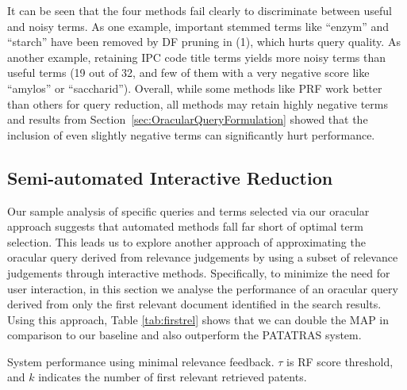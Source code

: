 It can be seen that the four methods fail clearly to discriminate between useful and noisy terms. As one example, important stemmed terms like ``enzym'' and ``starch'' have been removed by DF pruning in (1), which hurts query quality.  As another example, retaining IPC code title terms yields more noisy terms than useful terms (19 out of 32, and few of them with a very negative score like ``amylos'' or ``saccharid''). Overall, while some methods like PRF work better than others for query reduction, all methods may retain highly negative terms and results from Section~\ref{sec:OracularQueryFormulation} showed that the inclusion of even slightly negative terms can significantly hurt performance.
\subsection{Semi-automated Interactive Reduction}
\label{sec:SemiAutomatedInteractiveReduction}

Our sample analysis of specific queries and terms selected via our oracular
approach suggests that automated methods fall far short of optimal term selection.
This leads us to explore another approach of approximating the oracular query
derived from relevance judgements by using a subset of relevance judgements
through interactive methods.  Specifically, to minimize the need for user interaction,
in this section we analyse the performance of an oracular query derived from
only the first relevant document identified in the search results.
Using this approach, Table \ref{tab:firstrel} shows that we can double the MAP in comparison to our baseline and also outperform the PATATRAS system.

\begin{table}[t!]
  \begin{center}
   \caption{System performance using minimal relevance feedback. $\tau$ is RF score threshold, and $k$ indicates the number of first relevant retrieved patents.}\vspace{3mm}
     
  \label{tab:firstrel}
  \end{center}  
\end{table}

